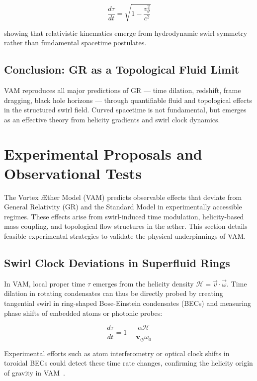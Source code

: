 \documentclass[preprint]{revtex4-2}
\begin{document}
    \begin{equation}
        \frac{d\tau}{dt} = \sqrt{1 - \frac{v_\theta^2}{c^2}}
    \end{equation}

    showing that relativistic kinematics emerge from hydrodynamic swirl symmetry rather than fundamental spacetime postulates.

    \subsection*{Conclusion: GR as a Topological Fluid Limit}
    VAM reproduces all major predictions of GR — time dilation, redshift, frame dragging, black hole horizons — through quantifiable fluid and topological effects in the structured swirl field. Curved spacetime is not fundamental, but emerges as an effective theory from helicity gradients and swirl clock dynamics.


\section{Experimental Proposals and Observational Tests}
    The Vortex \AE{}ther Model (VAM) predicts observable effects that deviate from General Relativity (GR) and the Standard Model in experimentally accessible regimes. These effects arise from swirl-induced time modulation, helicity-based mass coupling, and topological flow structures in the æther. This section details feasible experimental strategies to validate the physical underpinnings of VAM.

    \subsection{Swirl Clock Deviations in Superfluid Rings}
    In VAM, local proper time $\tau$ emerges from the helicity density \( \mathcal{H} = \vec{v} \cdot \vec{\omega} \). Time dilation in rotating condensates can thus be directly probed by creating tangential swirl in ring-shaped Bose-Einstein condensates (BECs) and measuring phase shifts of embedded atoms or photonic probes:

    \begin{equation}
        \frac{d\tau}{dt} = 1 - \frac{\alpha \mathcal{H}}{\mathbf{v}_{\scriptscriptstyle\boldsymbol{\circlearrowleft}} \omega_0}
    \end{equation}

    Experimental efforts such as atom interferometry or optical clock shifts in toroidal BECs could detect these time rate changes, confirming the helicity origin of gravity in VAM~\cite{pethick2008bose, kleckner2013creation, scheeler2014helicity}.
\end{document}
